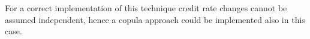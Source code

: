 \begin{codebox}
For a correct implementation of this technique credit rate changes cannot be assumed independent, hence a copula approach could be implemented also in this case.
%
%		
%				

\end{codebox}
